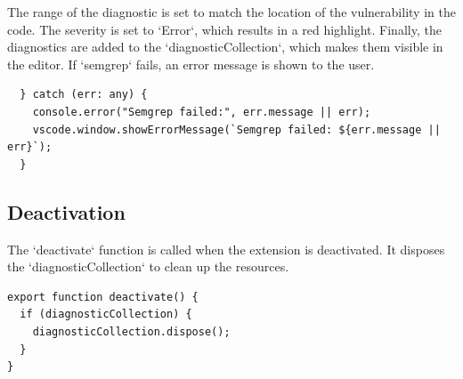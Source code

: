 The range of the diagnostic is set to match the location of the vulnerability in the code. The severity is set to `Error`, which results in a red highlight. Finally, the diagnostics are added to the `diagnosticCollection`, which makes them visible in the editor. If `semgrep` fails, an error message is shown to the user.

\begin{verbatim}
  } catch (err: any) {
    console.error("Semgrep failed:", err.message || err);
    vscode.window.showErrorMessage(`Semgrep failed: ${err.message || err}`);
  }
\end{verbatim}

\subsection{Deactivation}

The `deactivate` function is called when the extension is deactivated. It disposes the `diagnosticCollection` to clean up the resources.

\begin{verbatim}
export function deactivate() {
  if (diagnosticCollection) {
    diagnosticCollection.dispose();
  }
}
\end{verbatim}